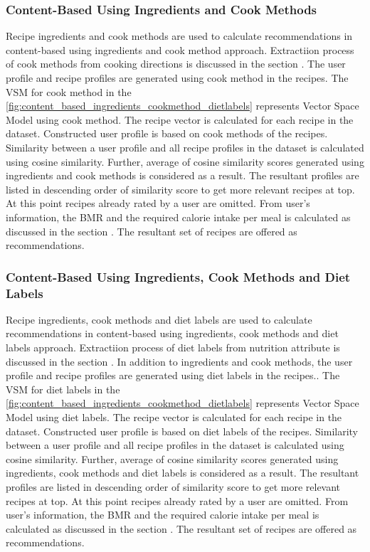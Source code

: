 \subsubsection{Content-Based Using Ingredients and Cook Methods}
\label{sec:cb_ingredients_cook_method}
Recipe ingredients and cook methods are used to calculate recommendations in content-based using ingredients and cook method approach. Extractiion process of cook methods from cooking directions is discussed in the section .  The user profile and recipe profiles are generated using cook method in the recipes. The VSM for cook method in the \autoref{fig:content_based_ingredients_cookmethod_dietlabels} represents Vector Space Model using cook method. The recipe vector is calculated for each recipe in the dataset. Constructed user profile is based on cook methods of the recipes. Similarity between a user profile and all recipe profiles in the dataset is calculated using cosine similarity. Further, average of cosine similarity scores generated using ingredients and cook methods is considered as a result. The resultant profiles are listed in descending order of similarity score to get more relevant recipes at top. At this point recipes already rated by a user are omitted. From user's information, the BMR and the required calorie intake per meal is calculated as discussed in the section . The resultant set of recipes are offered as recommendations. 

\subsubsection{Content-Based Using Ingredients, Cook Methods and Diet Labels}
\label{sec:cb_ingredients_cook_method_diet_labels}
Recipe ingredients, cook methods and diet labels are used to calculate recommendations in content-based using ingredients, cook methods and diet labels approach. Extractiion process of diet labels from nutrition attribute is discussed in the section . In addition to ingredients and cook methods, the user profile and recipe profiles are generated using diet labels in the recipes.. The VSM for diet labels in the \autoref{fig:content_based_ingredients_cookmethod_dietlabels} represents Vector Space Model using diet labels. The recipe vector is calculated for each recipe in the dataset. Constructed user profile is based on diet labels of the recipes. Similarity between a user profile and all recipe profiles in the dataset is calculated using cosine similarity. Further, average of cosine similarity scores generated using ingredients, cook methods and diet labels is considered as a result. The resultant profiles are listed in descending order of similarity score to get more relevant recipes at top. At this point recipes already rated by a user are omitted. From user's information, the BMR and the required calorie intake per meal is calculated as discussed in the section . The resultant set of recipes are offered as recommendations. 

